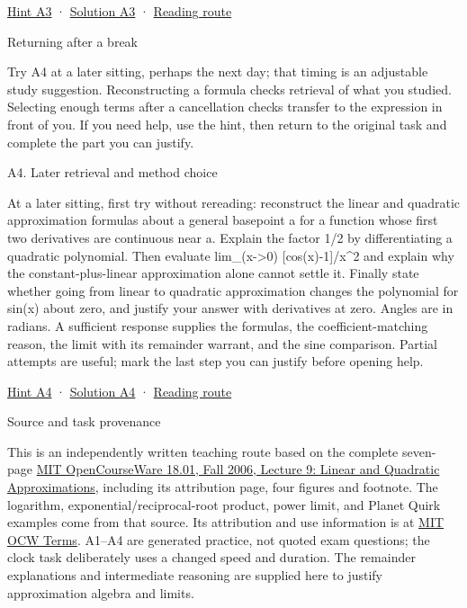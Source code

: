 \documentclass[
  11pt,
]{article}
\begin{document}
\protect\hyperlink{h3}{Hint A3} · \protect\hyperlink{s3}{Solution A3} ·
\protect\hyperlink{route}{Reading route}

Returning after a break

Try A4 at a later sitting, perhaps the next day; that timing is an
adjustable study suggestion. Reconstructing a formula checks retrieval
of what you studied. Selecting enough terms after a cancellation checks
transfer to the expression in front of you. If you need help, use the
hint, then return to the original task and complete the part you can
justify.

A4. Later retrieval and method choice

At a later sitting, first try without rereading: reconstruct the linear
and quadratic approximation formulas about a general basepoint a for a
function whose first two derivatives are continuous near a. Explain the
factor 1/2 by differentiating a quadratic polynomial. Then evaluate
lim\_(x-\textgreater0) {[}cos(x)-1{]}/x\^{}2 and explain why the
constant-plus-linear approximation alone cannot settle it. Finally state
whether going from linear to quadratic approximation changes the
polynomial for sin(x) about zero, and justify your answer with
derivatives at zero. Angles are in radians. A sufficient response
supplies the formulas, the coefficient-matching reason, the limit with
its remainder warrant, and the sine comparison. Partial attempts are
useful; mark the last step you can justify before opening help.

\protect\hyperlink{h4}{Hint A4} · \protect\hyperlink{s4}{Solution A4} ·
\protect\hyperlink{route}{Reading route}

Source and task provenance

This is an independently written teaching route based on the complete
seven-page
\href{https://ocw.mit.edu/courses/18-01-single-variable-calculus-fall-2006/40cb41807e6d67373f3299ce87c4d9b3_lec9.pdf}{MIT
OpenCourseWare 18.01, Fall 2006, Lecture 9: Linear and Quadratic
Approximations}, including its attribution page, four figures and
footnote. The logarithm, exponential/reciprocal-root product, power
limit, and Planet Quirk examples come from that source. Its attribution
and use information is at \href{https://ocw.mit.edu/terms/}{MIT OCW
Terms}. A1--A4 are generated practice, not quoted exam questions; the
clock task deliberately uses a changed speed and duration. The remainder
explanations and intermediate reasoning are supplied here to justify
approximation algebra and limits.
\end{document}
